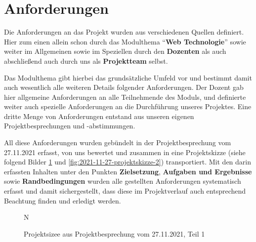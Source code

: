 
\section{Anforderungen} %



Die Anforderungen an das Projekt wurden aus verschiedenen Quellen definiert. Hier zum einen allein schon durch das Modulthema \enquote{\textbf{Web Technologie}} sowie weiter im Allgemeinen sowie im Speziellen durch den \textbf{Dozenten} als auch abschließend auch durch uns als \textbf{Projektteam} selbst. 

Das Modulthema gibt hierbei das grundsätzliche Umfeld vor und bestimmt damit auch wesentlich alle weiteren Details folgender Anforderungen. Der Dozent gab hier allgemeine Anforderungen an alle Teilnehmende des Moduls, und definierte weiter auch spezielle Anforderungen an die Durchführung unseres Projektes. Eine dritte Menge von Anforderungen entstand aus unseren eigenen Projektbesprechungen und -abstimmungen.  

All diese Anforderungen wurden gebündelt in der Projektbesprechung vom 27.11.2021 erfasst, von uns bewertet und zusammen in eine Projektskizze (siehe folgend Bilder \ref{fig:2021-11-27-projektskizze-1} und \ref{fig:2021-11-27-projektskizze-2}) transportiert. Mit den darin erfassten Inhalten unter den Punkten \textbf{Zielsetzung}, \textbf{Aufgaben und Ergebnisse} sowie \textbf{Randbedingungen} wurden alle gestellten Anforderungen systematisch erfasst und damit sichergestellt, dass diese im Projektverlauf auch entsprechend Beachtung finden und erledigt werden. 

\begin{figure}[H]N
    \centering
    \caption{Projektsizee aus Projektbesprechung vom 27.11.2021, Teil 1}
    \label{fig:2021-11-27-projektskizze-1}
\end{figure}


